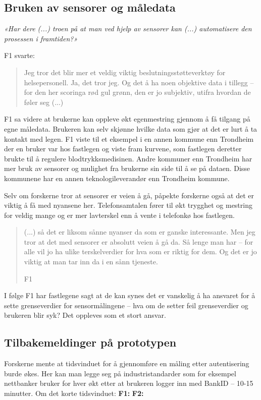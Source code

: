 \subsection{Bruken av sensorer og måledata}
\textit{«Har dere (...) troen på at man ved hjelp av sensorer kan (...) automatisere den prosessen i framtiden?»}

F1 svarte: \blockquote{Jeg tror det blir mer et veldig viktig beslutningsstøtteverktøy for helsepersonell. Ja, det tror jeg. Og det å ha noen objektive data i tillegg --
for den her scoringa rød gul grønn, den er jo subjektiv, utifra hvordan de føler seg (...)}
F1 sa videre at brukerne kan oppleve økt egenmestring gjennom å få tilgang på egne måledata. Brukeren kan selv skjønne hvilke data som gjør at det er lurt å
ta kontakt med legen. F1 viste til et eksempel i en annen kommune enn Trondheim der en bruker var hos fastlegen og viste fram kurvene, som
fastlegen deretter brukte til å regulere blodtrykksmedisinen. Andre kommuner enn Trondheim har mer bruk av sensorer og mulighet fra brukerne sin side
til å se på dataen. Disse kommunene har en annen teknologileverandør enn Trondheim kommune.

Selv om forskerne tror at sensorer er veien å gå, påpekte forskerne også at det er viktig å få med nyansene her.
Telefonsamtalen fører til økt trygghet og mestring for veldig mange og er mer lavterskel enn å vente i telefonkø hos
fastlegen. \blockquote[F1]{(...) så det er liksom sånne nyanser da som er ganske interessante. Men jeg tror at det med sensorer er absolutt veien å gå da. Så lenge man
har -- for alle vil jo ha ulike terskelverdier for hva som er riktig for dem. Og det er jo viktig at man tar inn da i en sånn tjeneste.}
I følge F1 har fastlegene sagt at de kan synes det er vanskelig å ha ansvaret for å sette grenseverdier
for sensormålingene -- hva om de setter feil grenseverdier og brukeren blir syk? Det oppleves som et stort ansvar.

\subsection{Tilbakemeldinger på prototypen}
Forskerne mente at tidsvinduet for å gjennomføre en måling etter autentisering burde økes. Her kan man legge seg på industristandarder
som for eksempel nettbanker bruker for hver økt etter at brukeren logger inn med BankID -- 10-15 minutter.
Om det korte tidsvinduet: \newline
\textbf{F1:}  \newline
\textbf{F2:} 

